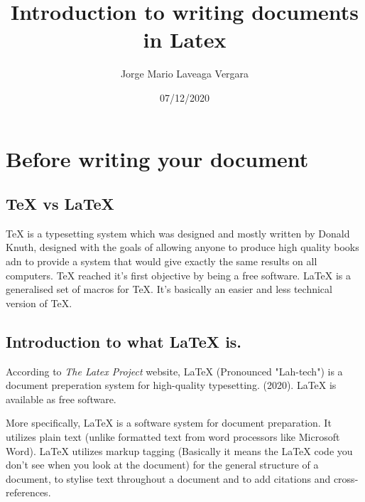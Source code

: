 \documentclass[12pt]{article}
\title{Introduction to writing documents in Latex}
\author{Jorge Mario Laveaga Vergara}
\date{07/12/2020}
\begin{document}
	\maketitle
	
	\section{Before writing your document}
		\subsection{TeX vs LaTeX}
		{TeX is a typesetting system which was designed and mostly written by Donald Knuth, designed with the goals of allowing anyone to produce high quality books adn to provide a system that would give exactly the same results on all computers. TeX reached it's first objective by being a free software. LaTeX is a generalised set of macros for TeX. It's basically an easier and less technical version of TeX.}\par
		\subsection{Introduction to what LaTeX is.}
			{According to \textit{The Latex Project} website, LaTeX (Pronounced "Lah-tech") is a document preperation system for high-quality typesetting.  \cite{latexOfficial}(2020). LaTeX is available as free software.}\par
			{More specifically, LaTeX is a software system for document preparation. It utilizes plain text (unlike formatted text from word processors like Microsoft Word). LaTeX utilizes markup tagging (Basically it means the LaTeX code you don't see when you look at the document) for the general structure of a document, to stylise text throughout a document and to add citations and cross-references.}\par \cite{latexWikipedia}
			
\end{document}
